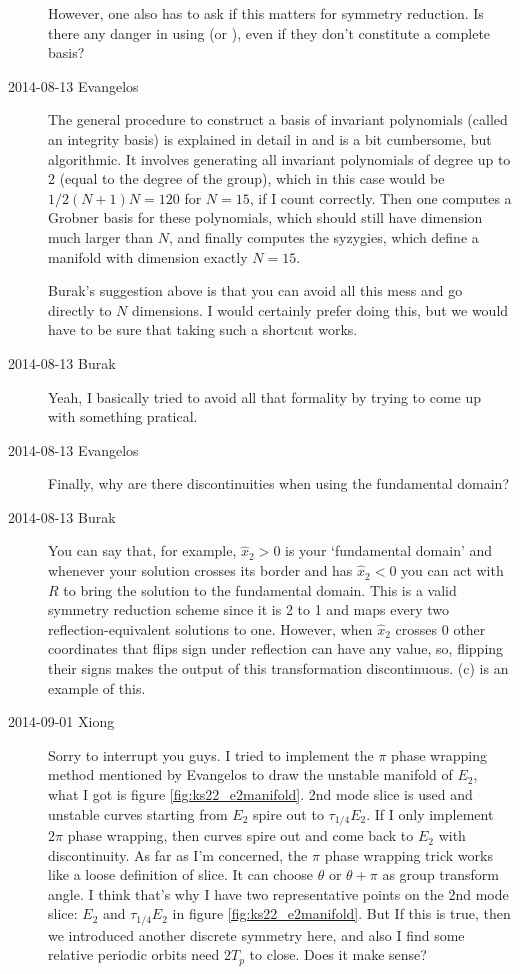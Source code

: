 \begin{description}
However, one also has to ask if this matters for symmetry reduction. Is there any danger in using
 (or ), even if they don't constitute a complete basis?

\item[2014-08-13 Evangelos] The general procedure to construct a basis of invariant polynomials
(called an integrity basis) is explained in detail in  and is a bit cumbersome, but
algorithmic. It involves generating all invariant polynomials of degree up to 2 (equal to the degree of the group),
which in this case would be $1/2(N+1)N=120$ for $N=15$, if I count correctly. Then one computes a
Grobner basis for these polynomials, which should still have dimension much larger than $N$, and finally
computes the syzygies, which define a manifold with dimension exactly $N=15$.

Burak's suggestion above is that you can avoid all this mess and go directly to $N$ dimensions.
I would certainly prefer doing this, but we would have to be sure that taking such a shortcut works.

\item[2014-08-13 Burak] Yeah, I basically tried to avoid all that formality by trying
to come up with something pratical.

\item[2014-08-13 Evangelos] Finally, why are there discontinuities when using the fundamental domain?

\item[2014-08-13 Burak] You can say that, for example, $\hat{x}_2 > 0$ is your
`fundamental domain' and whenever your solution crosses its border and has $\hat{x}_2 < 0$
you can act with $R$ to bring the solution to the fundamental domain. This is a
valid symmetry reduction scheme since it is 2 to 1 and maps every two
reflection-equivalent solutions to one. However, when $\hat{x}_2$ crosses $0$ other
coordinates that flips sign under reflection can have any value, so, flipping
their signs makes the output of this transformation discontinuous.
 (c) is an example of this.

\item[2014-09-01 Xiong]
Sorry to interrupt you guys. I tried to implement the $\pi$ phase
wrapping method mentioned by Evangelos to draw the unstable manifold
of $E_2$, what I got is figure \ref{fig:ks22_e2manifold}. 2nd mode
slice is used and unstable curves starting from $E_2$ spire
out to $\tau_{1/4}E_2$. If
I only implement $2\pi$ phase wrapping, then curves spire out and
come back to $E_2$ with discontinuity. As far as I'm concerned,
the $\pi$ phase wrapping trick works like a loose definition
of slice. It can choose $\theta$ or $\theta+\pi$ as group transform
angle. I think that's why I have two representative points on the 2nd
mode slice: $E_2$ and $\tau_{1/4}E_2$ in figure \ref{fig:ks22_e2manifold}.
But If this is true, then we introduced another discrete symmetry here,
and also I find some relative periodic orbits need $2T_p$ to close.
Does it make sense?


\end{description}
